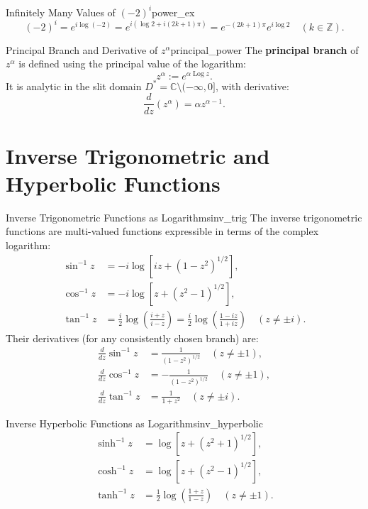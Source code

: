 \begin{example}{Infinitely Many Values of $(-2)^i$}{power_ex}
\begin{equation}
(-2)^i = e^{i \log(-2)} = e^{i(\log 2 + i(2k+1)\pi)} = e^{-(2k+1)\pi} e^{i \log 2} \quad (k \in \mathbb{Z}).
\end{equation}
\end{example}

\begin{definition}{Principal Branch and Derivative of $z^\alpha$}{principal_power}
The \textbf{principal branch} of $z^\alpha$ is defined using the principal value of the logarithm:
\begin{equation}
z^\alpha := e^{\alpha \operatorname{Log} z}.
\end{equation}
It is analytic in the slit domain $D^* = \mathbb{C} \setminus (-\infty, 0]$, with derivative:
\begin{equation}
\frac{d}{dz} (z^\alpha) = \alpha z^{\alpha - 1}.
\end{equation}
\end{definition}


\section{Inverse Trigonometric and Hyperbolic Functions}

\begin{proposition}{Inverse Trigonometric Functions as Logarithms}{inv_trig}
The inverse trigonometric functions are multi-valued functions expressible in terms of the complex logarithm:
\begin{align}
\sin^{-1} z &= -i \log\left[iz + (1 - z^2)^{1/2}\right], \\
\cos^{-1} z &= -i \log\left[z + (z^2 - 1)^{1/2}\right], \\
\tan^{-1} z &= \frac{i}{2} \log\left(\frac{i + z}{i - z}\right) = \frac{i}{2} \log\left(\frac{1 - iz}{1 + iz}\right) \quad (z \neq \pm i).
\end{align}
Their derivatives (for any consistently chosen branch) are:
\begin{align}
\frac{d}{dz}\sin^{-1} z &= \frac{1}{(1 - z^2)^{1/2}} \quad (z \neq \pm 1), \\
\frac{d}{dz}\cos^{-1} z &= -\frac{1}{(1 - z^2)^{1/2}} \quad (z \neq \pm 1), \\
\frac{d}{dz}\tan^{-1} z &= \frac{1}{1 + z^2} \quad (z \neq \pm i).
\end{align}
\end{proposition}

\begin{proposition}{Inverse Hyperbolic Functions as Logarithms}{inv_hyperbolic}
\begin{align}
\sinh^{-1} z &= \log\left[z + (z^2 + 1)^{1/2}\right], \\
\cosh^{-1} z &= \log\left[z + (z^2 - 1)^{1/2}\right], \\
\tanh^{-1} z &= \frac{1}{2} \log\left(\frac{1 + z}{1 - z}\right) \quad (z \neq \pm 1).
\end{align}
\end{proposition}
